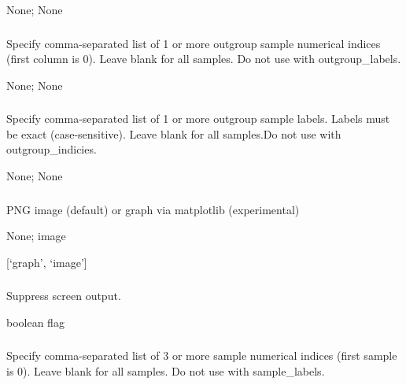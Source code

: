 \documentclass[letterpaper,11pt,english]{sphinxmanual}
\begin{document}
 None;  None


\subsubsection{}
\label{\detokenize{prog_desc:id142}}
 Specify comma-separated list of 1 or more outgroup sample numerical indices (first column is 0). Leave blank for all samples. Do not use with \textendash{}outgroup\_labels.

 None;  None


\subsubsection{}
\label{\detokenize{prog_desc:id143}}
 Specify comma-separated list of 1 or more outgroup sample labels. Labels must be exact (case-sensitive). Leave blank for all samples.Do not use with \textendash{}outgroup\_indicies.

 None;  None


\subsubsection{}
\label{\detokenize{prog_desc:plot-type-plottype}}
 PNG image (default) or graph via matplotlib (experimental)

 None;  image

 {[}‘graph’, ‘image’{]}


\subsubsection{}
\label{\detokenize{prog_desc:id144}}
 Suppress screen output.

 boolean flag


\subsubsection{}
\label{\detokenize{prog_desc:id145}}
 Specify comma-separated list of 3 or more sample numerical indices (first sample is 0). Leave blank for all samples. Do not use with \textendash{}sample\_labels.
\end{document}
